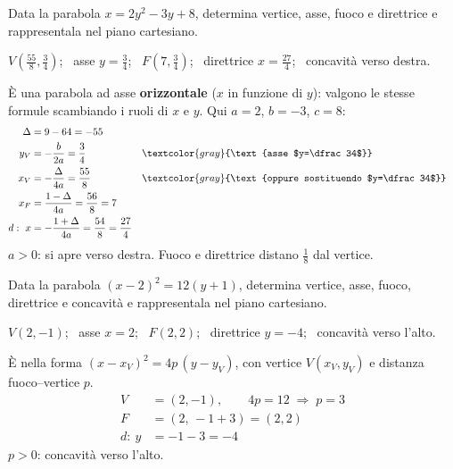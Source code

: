 \begin{question}[ID=1.2, subtitle={Parabola $x=2y^2-3y+8$: elementi caratteristici}, difficulty=facile, tags={parabola}]
Data la parabola $x=2y^2-3y+8$, determina vertice, asse, fuoco e direttrice e rappresentala nel piano cartesiano.
\begin{solution}
$V\left(\tfrac{55}{8},\tfrac34\right)$; \ asse $y=\tfrac34$; \ $F\left(7,\tfrac34\right)$; \ direttrice $x=\tfrac{27}{4}$; \ concavità verso destra.
\end{solution}
\begin{explanation}
È una parabola ad asse \textbf{orizzontale} ($x$ in funzione di $y$): valgono le stesse formule scambiando i ruoli di $x$ e $y$. Qui $a=2$, $b=-3$, $c=8$:
\[\begin{aligned}
\Delta &= 9-64=-55\\
y_V &= -\dfrac{b}{2a}=\dfrac34 && \textcolor{gray}{\text{asse $y=\dfrac34$}}\\
x_V &= -\dfrac{\Delta}{4a}=\dfrac{55}{8} && \textcolor{gray}{\text{oppure sostituendo $y=\dfrac34$}}\\
x_F &= \dfrac{1-\Delta}{4a}=\dfrac{56}{8}=7\\
d:\ x &= -\dfrac{1+\Delta}{4a}=\dfrac{54}{8}=\dfrac{27}{4}
\end{aligned}\]
$a>0$: si apre verso destra. Fuoco e direttrice distano $\tfrac18$ dal vertice.
\end{explanation}
\end{question}


\begin{question}[ID=1.3, subtitle={Parabola $(x-2)^2=12(y+1)$: elementi caratteristici}, difficulty=media, tags={parabola}]
Data la parabola $(x-2)^2=12(y+1)$, determina vertice, asse, fuoco, direttrice e concavità e rappresentala nel piano cartesiano.
\begin{solution}
$V(2,-1)$; \ asse $x=2$; \ $F(2,2)$; \ direttrice $y=-4$; \ concavità verso l'alto.
\end{solution}
\begin{explanation}
È nella forma $(x-x_V)^2=4p\,(y-y_V)$, con vertice $V(x_V,y_V)$ e distanza fuoco–vertice $p$.
\[\begin{aligned}
V &= (2,-1), \qquad 4p=12 \;\Rightarrow\; p=3\\
F &= (2,\,-1+3)=(2,2)\\
d:\ y &= -1-3=-4
\end{aligned}\]
$p>0$: concavità verso l'alto.
\end{explanation}
\end{question}

